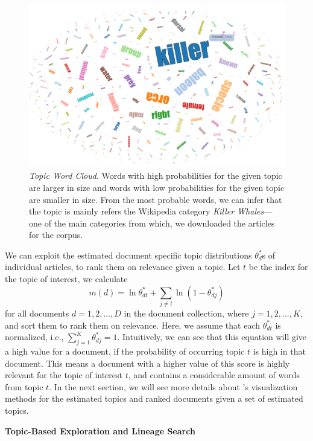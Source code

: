\begin{figure}[htb]\centering 
\includegraphics[width=.9\textwidth]{images/topic_visualization.png}
\caption{\textsl{Topic Word Cloud}. Words with high probabilities for the 
given topic are larger in size and words with low probabilities for 
the given topic are smaller in size. From the most probable words, 
we can infer that the topic is mainly refers the Wikipedia category 
\textit{Killer Whales}---one of the main categories from which, we 
downloaded the articles for the corpus.}
\label{fig:topic-word-cloud}
\end{figure}

We can exploit the estimated document specific topic 
distributions $\theta_d^{*}$s of individual articles, to rank them 
on relevance given a topic. Let $t$ be the index for the topic of 
interest, we calculate~\cite{George2012}
\begin{equation}
m(d) = \ln \theta^*_{dt} + \sum_{j \neq t}{\ln (1 - \theta^*_{dj})}
\end{equation}
for all documents $d = 1, 2, \ldots, D$ in the document collection, 
where $j = 1, 2, \ldots, K$, and sort them to rank them on relevance. 
Here, we assume that each $\theta^*_{dt}$ is normalized, i.e., 
$\sum_{j=1}^{K}{\theta^*_{dj}} = 1$. Intuitively, we can see that 
this equation will give a high value for a document, if the probability 
of occurring topic $t$ is high in that document. This means a 
document with a higher value of this score is highly relevant for 
the topic of interest $t$, and contains a considerable amount of 
words from topic $t$. In the next section, we will see more details 
about \system's visualization methods for the estimated topics and 
ranked documents given a set of estimated topics.      


\noindent\textbf{Topic-Based Exploration and Lineage Search}

